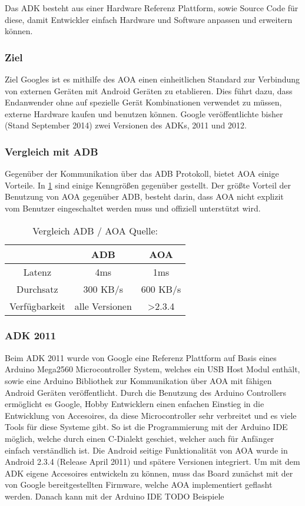 \documentclass[12pt,journal,compsoc]{IEEEtran}
\begin{document}
Das ADK besteht aus einer Hardware Referenz Plattform, sowie Source Code für diese, damit 
Entwickler einfach Hardware und Software anpassen und erweitern können.
\cite{developaoa}
\subsubsection{Ziel}
Ziel Googles ist es mithilfe des AOA einen einheitlichen Standard zur Verbindung von externen Geräten mit Android Geräten zu etablieren.
Dies führt dazu, dass Endanwender ohne auf spezielle Gerät Kombinationen verwendet zu müssen, externe Hardware kaufen und benutzen können.
Google veröffentlichte bisher (Stand September 2014) zwei Versionen des ADKs, 2011 und 2012. 

\subsubsection{Vergleich mit ADB}
Gegenüber der Kommunikation über das ADB Protokoll, bietet AOA einige Vorteile. In \ref{table:vergl} sind einige Kenngrößen gegenüber gestellt. Der größte Vorteil der Benutzung von AOA gegenüber ADB, besteht darin, dass AOA nicht explizit vom Benutzer eingeschaltet werden muss und offiziell unterstützt wird.


\begin{table}
	\centering
	\caption{Vergleich ADB / AOA Quelle: \cite{comp}}
	\label{table:vergl}
	\begin{tabular}{c | c | c}
		& ADB & AOA \\ \hline
		Latenz & 4ms & 1ms \\ \hline
		Durchsatz & 300 KB/s & 600 KB/s \\ \hline
		Verfügbarkeit & alle Versionen & \textgreater 2.3.4 \\ \hline
	\end{tabular}
\end{table}


\subsubsection{ADK 2011}
Beim ADK 2011 wurde von Google eine
Referenz Plattform auf Basis eines Arduino Mega2560 Microcontroller System, welches ein USB Host Modul enthält, sowie eine Arduino Bibliothek zur Kommunikation über AOA mit fähigen Android Geräten veröffentlicht.
Durch die Benutzung des Arduino Controllers ermöglicht es Google, Hobby Entwicklern einen enfachen Einstieg in die Entwicklung von Accesoires, da diese Microcontroller sehr verbreitet und es viele Tools für diese Systeme gibt.
So ist die Programmierung mit der Arduino IDE möglich, welche durch einen C-Dialekt geschiet, welcher auch für Anfänger einfach verständlich ist.
Die Android seitige Funktionalität von AOA wurde in Android 2.3.4 (Release April 2011) und spätere Versionen integriert. 
Um mit dem ADK eigene Accesoires entwickeln zu können, muss das Board zunächst mit der von Google bereitgestellten Firmware, welche AOA implementiert geflasht werden.
Danach kann mit der Arduino IDE 
TODO Beispiele
\end{document}
